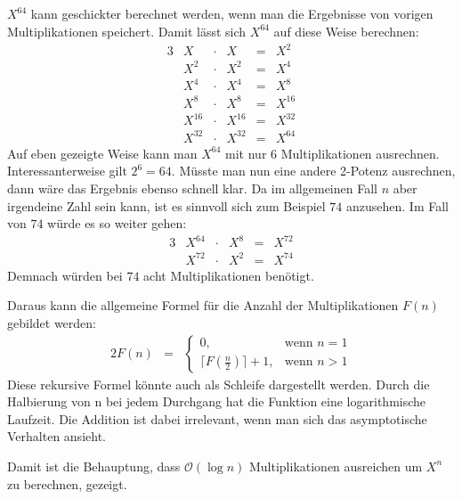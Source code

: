 \documentclass[10pt,a4paper,oneside,ngerman,numbers=noenddot]{scrartcl}
\begin{document}
	\subsection{} %
	$X^{64}$ kann geschickter berechnet werden, wenn man die Ergebnisse von vorigen Multiplikationen speichert. Damit lässt sich $X^{64}$ auf diese Weise berechnen:\\
	\begin{alignat*}{3}
	& X &\cdot & X &=& X^{2} \\
	& X^{2} &\cdot & X^{2} &=& X^{4} \\
	& X^{4} &\cdot & X^{4} &=& X^{8} \\
	& X^{8} &\cdot & X^{8} &=& X^{16} \\
	& X^{16} &\cdot & X^{16} &=& X^{32} \\
	& X^{32} &\cdot & X^{32} &=& X^{64}
	\end{alignat*}
	Auf eben gezeigte Weise kann man $X^{64}$ mit nur $6$ Multiplikationen ausrechnen. Interessanterweise gilt $2^{6} = 64$. Müsste man nun eine andere 2-Potenz ausrechnen, dann wäre das Ergebnis ebenso schnell klar. Da im allgemeinen Fall $n$ aber irgendeine Zahl sein kann, ist es sinnvoll sich zum Beispiel $74$ anzusehen. Im Fall von $74$ würde es so weiter gehen:
	\begin{alignat*}{3}
	& X^{64} &\cdot & X^{8} &=& X^{72} \\
	& X^{72} &\cdot & X^{2} &=& X^{74}
	\end{alignat*}
	Demnach würden bei $74$ acht Multiplikationen benötigt.
	
	Daraus kann die allgemeine Formel für die Anzahl der Multiplikationen $F(n)$ gebildet werden:\\
	\begin{alignat*}{2}
	F(n) &=& \begin{cases}
  0,  & \text{wenn } n = 1\\
  \lceil F(\frac{n}{2}) \rceil + 1, & \text{wenn } n > 1
		\end{cases}
	\end{alignat*}
	Diese rekursive Formel könnte auch als Schleife dargestellt werden. Durch die Halbierung von n bei jedem Durchgang hat die Funktion eine logarithmische Laufzeit. Die Addition ist dabei irrelevant, wenn man sich das asymptotische Verhalten ansieht.
	
	Damit ist die Behauptung, dass $\mathcal{O}(\log n)$ Multiplikationen ausreichen um $X^{n}$ zu berechnen, gezeigt.
	\subsection{} %
\end{document}
